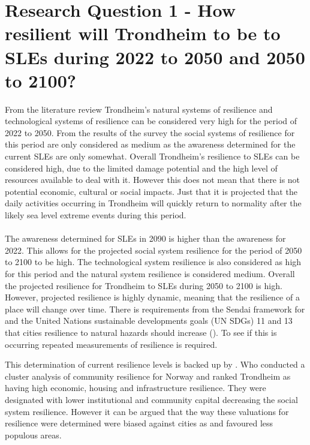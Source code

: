 \section{Research Question 1 - How resilient will Trondheim to be to SLEs during 2022 to 2050 and 2050 to 2100? }
From the literature review Trondheim's natural systems of resilience and technological systems of resilience can be considered very high for the period of 2022 to 2050. From the results of the survey the  social systems of resilience for this period are only considered as medium as the awareness determined for the current SLEs are only somewhat. Overall Trondheim's resilience to SLEs can be considered high, due to the limited damage potential and the high level of resources available to deal with it. However this does not mean that there is not potential economic, cultural or social impacts. Just that it is projected that the daily activities occurring in Trondheim will quickly return to normality after the likely sea level extreme events during this period.
\paragraph{}
The awareness determined for SLEs in 2090 is higher than the awareness for 2022. This allows for the projected social system resilience for the period of 2050 to 2100 to be high. The technological system resilience is also considered as high for this period and the natural system resilience is considered medium. Overall the projected resilience for Trondheim to SLEs during 2050 to 2100 is high. However, projected resilience is highly dynamic, meaning that the resilience of a place will change over time. There is requirements from the Sendai framework for and the United Nations sustainable developments goals (UN SDGs) 11 and 13 that cities resilience to natural hazards should increase (\cite{gonzalez-riancho_storm_2017}). To see if this is occurring repeated measurements of resilience is required. 

This determination of current resilience levels is backed up by \cite{opach_seeking_2020}. Who conducted a cluster analysis of community resilience for Norway and ranked Trondheim as having high economic, housing and infrastructure resilience. They were designated with lower institutional and community capital decreasing the social system resilience. However it can be argued that the way these valuations for resilience were determined were biased against cities as and favoured less populous areas.

